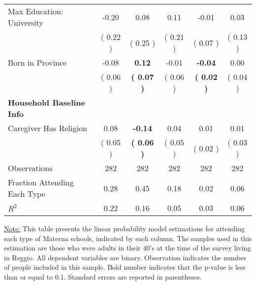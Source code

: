 \begin{table}[H]
{\begin{tabular}{lccccc}
\quad Max Education: University &     -0.20 &      0.08 &      0.11 &     -0.01 &      0.03 \\
\quad  & (     0.22 ) & (     0.25 )  & (     0.21 )  & (     0.07 ) & (     0.13 ) \\
\quad Born in Province &     -0.08 & \textbf{     0.12} &     -0.01 & \textbf{    -0.04} &      0.00 \\
\quad  & (     0.06 ) & \textbf{(     0.07 )}  & (     0.06 )  & \textbf{(     0.02 )} & (     0.04 ) \\
\midrule
\textbf{Household Baseline Info} \\
\quad Caregiver Has Religion &      0.08 & \textbf{    -0.14} &      0.04 &      0.01 &      0.01 \\
\quad  & (     0.05 ) & \textbf{(     0.06 )}  & (     0.05 )  & (     0.02 ) & (     0.03 ) \\
\midrule
Observations & 282 & 282 & 282 & 282 & 282 \\
Fraction Attending Each Type &      0.28 &      0.45 &      0.18 &      0.02 &      0.06 \\
\midrule
$ R^2$ &      0.22 &      0.16 &      0.05 &      0.03 &      0.06 \\
\bottomrule
\end{tabular}}
\end{table}
\begin{scriptsize}
\noindent\underline{Note:} This table presents the linear probability model estimations for attending each type of Materna schools, indicated by each column. The samples used in this estimation are those who were adults in their 40's at the time of the survey living in Reggio. All dependent variables are binary. Observation indicates the number of people included in this sample. Bold number indicates that the p-value is less than or equal to 0.1. Standard errors are reported in parentheses.
\end{scriptsize}
